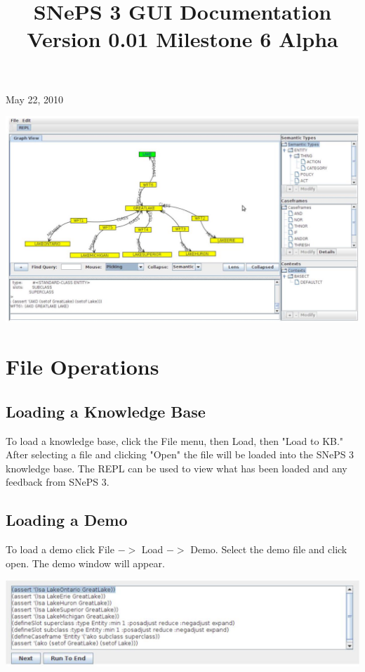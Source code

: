 \documentclass[10pt]{article}
\title{SNePS 3 GUI Documentation Version 0.01 Milestone 6 Alpha }
\author{}
\date{}
\begin{document}
\maketitle
May 22, 2010

\begin{center}
\includegraphics[max width=\textwidth]{2023_06_06_402e2c8ca4c84733095bg-1}
\end{center}

\section{File Operations}
\subsection{Loading a Knowledge Base}
To load a knowledge base, click the File menu, then Load, then "Load to KB." After selecting a file and clicking "Open" the file will be loaded into the SNePS 3 knowledge base. The REPL can be used to view what has been loaded and any feedback from SNePS 3.

\subsection{Loading a Demo}
To load a demo click File $->$ Load $->$ Demo. Select the demo file and click open. The demo window will appear.

\begin{center}
\includegraphics[max width=\textwidth]{2023_06_06_402e2c8ca4c84733095bg-2}
\end{center}
\end{document}
